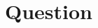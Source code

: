 \documentclass[
 size=14pt,
 paper=smartboard,  %
 mode=present, 		%
 display=slides, 	%
 style=tuliplab,  	%
 pauseslide,
 fleqn,leqno]{powerdot}
\begin{document}


\section{Question}













\end{document}

